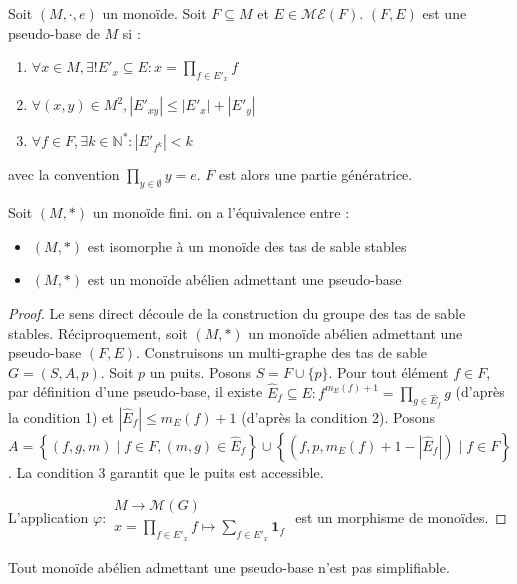 \begin{definition}
Soit $(M, \cdot, e)$ un monoïde.
Soit $F \subseteq M$ et $E \in \mathcal{ME}(F)$.
$(F, E)$ est une pseudo-base de $M$ si :
\begin{enumerate}
    \item $\forall x \in M, \exists ! E'_x \subseteq E: x = \prod_{f \in E'_x} f$
    \item $\forall (x, y) \in M^2, |E'_{xy}| \leqslant |E'_x| + |E'_y|$
    \item $\forall f \in F, \exists k \in \mathbb{N}^*: |E'_{f^k}| < k$
\end{enumerate}
avec la convention $\prod_{y \in \emptyset} y = e$.
$F$ est alors une partie génératrice.
\end{definition}

\begin{proposition}
Soit $(M, *)$ un monoïde fini.
on a l'équivalence entre :
\begin{itemize}[label=\textbullet]
    \item $(M, *)$ est isomorphe à un monoïde des tas de sable stables
    \item $(M, *)$ est un monoïde abélien admettant une pseudo-base
\end{itemize}
\end{proposition}

\begin{proof}
Le sens direct découle de la construction du groupe des tas de sable stables.
Réciproquement, soit $(M, *)$ un monoïde abélien admettant une pseudo-base
$(F, E)$.
Construisons un multi-graphe des tas de sable $G = (S, A, p)$.
Soit $p$ un puits. Posons $S = F \cup \{p\}$.
Pour tout élément $f \in F$, par définition d'une pseudo-base, il existe
$\hat{E}_f \subseteq E : f^{m_E(f)+1} = \prod_{g \in \hat{E}_f} g$ (d'après la
condition 1) et $|\hat{E}_f| \leqslant m_E(f) + 1$ (d'après la condition 2).
Posons $A = \left\{ (f, g, m) \;|\; f \in F, (m, g) \in \hat{E}_f \right\}
\cup \left\{ (f, p, m_E(f) + 1 - |\hat{E}_f|) \;|\; f \in F \right\}$.
La condition $3$ garantit que le puits est accessible.

L'application $\varphi: \begin{matrix}
M \rightarrow \mathcal{M}(G) \\
x = \prod_{f \in E'_x} f \mapsto \sum_{f \in E'_x} \mathbf{1}_f
\end{matrix}$
est un morphisme de monoïdes.
\end{proof}

\begin{corollaire}
Tout monoïde abélien admettant une pseudo-base n'est pas simplifiable.
\end{corollaire}

